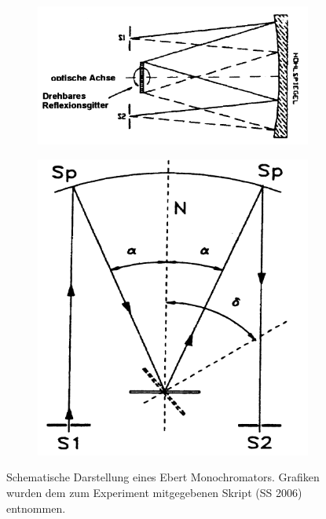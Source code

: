 \documentclass[]{article}
\begin{document}
\begin{figure}[!h]
\centering
\begin{subfigure}{0.55\textwidth}
\includegraphics[width=\linewidth]{Plots/1.png}
\end{subfigure}
\begin{subfigure}[c]{0.4\linewidth}
\includegraphics[width=\linewidth]{Plots/2.png}
\end{subfigure}
\caption{Schematische Darstellung eines Ebert Monochromators. Grafiken wurden dem zum Experiment mitgegebenen Skript (SS 2006) entnommen. }
\label{fig:Monochromator}
\end{figure}
\end{document}
